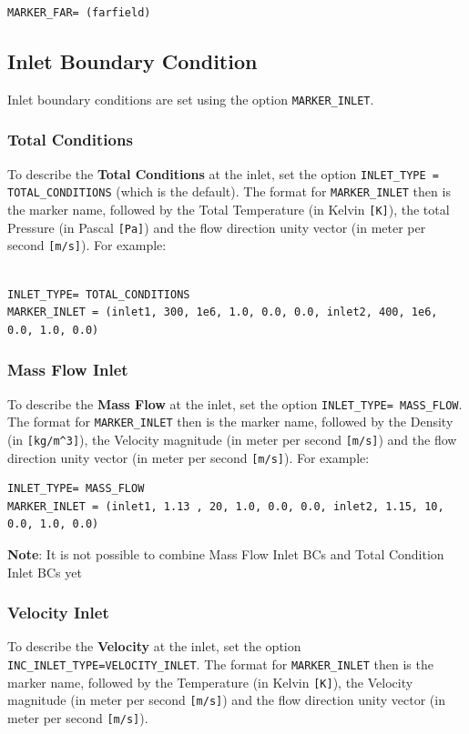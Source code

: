 \documentclass[12pt, a4paper, twoside]{article}
\begin{document}
\begin{lstlisting}
MARKER_FAR= (farfield)

\end{lstlisting}


\subsection{Inlet Boundary Condition}
Inlet boundary conditions are set using the option \verb|MARKER_INLET|.

\subsubsection{Total Conditions}
To describe the \textbf{Total Conditions} at the inlet, set the option \texttt{INLET\_TYPE = TOTAL\_CONDITIONS} (which is the default). The format for \verb|MARKER_INLET| then is the marker name, followed by the Total Temperature (in Kelvin \verb|[K]|), the total Pressure (in Pascal \verb|[Pa]|) and the flow direction unity vector (in meter per second \verb|[m/s]|). For example:

\begin{lstlisting}

INLET_TYPE= TOTAL_CONDITIONS
MARKER_INLET = (inlet1, 300, 1e6, 1.0, 0.0, 0.0, inlet2, 400, 1e6, 0.0, 1.0, 0.0)

\end{lstlisting}


\subsubsection{Mass Flow Inlet}
To describe the \textbf{Mass Flow} at the inlet, set the option \verb|INLET_TYPE= MASS_FLOW|. The format for \verb|MARKER_INLET| then is the marker name, followed by the Density (in \verb|[kg/m^3]|), the Velocity magnitude (in meter per second \verb|[m/s]|) and the flow direction unity vector (in meter per second \verb|[m/s]|). For example:

\begin{lstlisting}
INLET_TYPE= MASS_FLOW
MARKER_INLET = (inlet1, 1.13 , 20, 1.0, 0.0, 0.0, inlet2, 1.15, 10, 0.0, 1.0, 0.0)

\end{lstlisting}


\textbf{Note}: It is not possible to combine Mass Flow Inlet BCs and Total Condition Inlet BCs yet

\subsubsection{Velocity Inlet}
To describe the \textbf{Velocity} at the inlet, set the option \texttt{INC\_INLET\_TYPE=VELOCITY\_INLET}. The format for \verb|MARKER_INLET| then is the marker name, followed by the Temperature (in Kelvin \verb|[K]|), the Velocity magnitude (in meter per second \verb|[m/s]|) and the flow direction unity vector (in meter per second \verb|[m/s]|).
\end{document}
